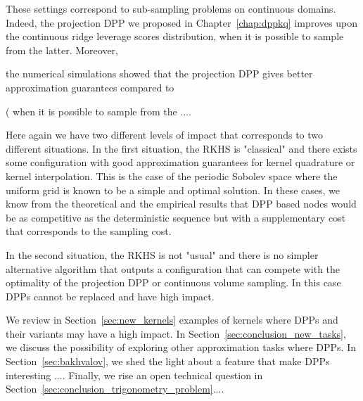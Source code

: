 \documentclass[twoside,11pt]{book}
\numberwithin{theorem}{chapter}
\numberwithin{definition}{chapter}
\numberwithin{proposition}{chapter}
\numberwithin{corollary}{chapter}
\numberwithin{example}{chapter}
\numberwithin{lemma}{chapter}
\numberwithin{assumption}{chapter}
\numberwithin{equation}{chapter}
\numberwithin{figure}{chapter}
\DeclareMathOperator{\X}{\mathcal{X}}
\begin{document}
These settings correspond to sub-sampling problems on continuous domains. Indeed, the projection DPP we proposed in Chapter~\ref{chap:dppkq} improves upon the continuous ridge leverage scores distribution, when it is possible to sample from the latter. Moreover, 


the numerical simulations showed that the projection DPP gives better approximation guarantees compared to 


 ( when it is possible to sample from the 
....

Here again we have two different levels of impact that corresponds to two different situations. In the first situation, the RKHS is "classical" and there exists some configuration with good approximation guarantees for kernel quadrature or kernel interpolation. This is the case of 
the periodic Sobolev space where the uniform grid is known to be a simple and optimal solution. In these cases, we know from the theoretical and the empirical results that DPP based nodes would be as competitive as the deterministic sequence but with a supplementary cost that corresponds to the sampling cost.


In the second situation, the RKHS is not "usual" and there is no simpler alternative algorithm that outputs a configuration that can compete with the optimality of the projection DPP or continuous volume sampling. In this case DPPs cannot be replaced and have high impact. 

We review in Section~\ref{sec:new_kernels} examples of kernels where DPPs and their variants may have a high impact. In Section~\ref{sec:conclusion_new_tasks}, we discuss the possibility of exploring other approximation tasks where DPPs. In Section~\ref{sec:bakhvalov}, we shed the light about a feature that make DPPs interesting .... Finally, we rise an open technical question in Section~\ref{sec:conclusion_trigonometry_problem}.... 









\end{document}
